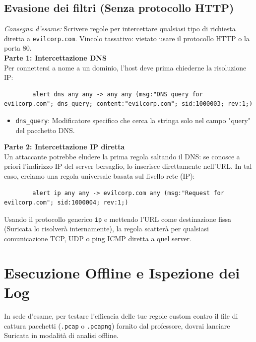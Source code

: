 \documentclass[12pt,a4paper]{report}
\begin{document}
	\subsection{Evasione dei filtri (Senza protocollo HTTP)}
	\textit{Consegna d'esame:} Scrivere regole per intercettare qualsiasi tipo di richiesta diretta a \texttt{evilcorp.com}. Vincolo tassativo: vietato usare il protocollo HTTP o la porta 80.\\
	\textbf{Parte 1: Intercettazione DNS}\\
	Per connettersi a nome a un dominio, l'host deve prima chiederne la risoluzione IP:
	\begin{lstlisting}
		alert dns any any -> any any (msg:"DNS query for evilcorp.com"; dns_query; content:"evilcorp.com"; sid:1000003; rev:1;)
	\end{lstlisting}
	\begin{itemize}
		\item \texttt{dns\_query}: Modificatore specifico che cerca la stringa solo nel campo "query" del pacchetto DNS.
	\end{itemize}
	\textbf{Parte 2: Intercettazione IP diretta}\\
	Un attaccante potrebbe eludere la prima regola saltando il DNS: se conosce a priori l'indirizzo IP del server bersaglio, lo inserisce direttamente nell'URL. In tal caso, creiamo una regola universale basata sul livello rete (IP):
	\begin{lstlisting}
		alert ip any any -> evilcorp.com any (msg:"Request for evilcorp.com"; sid:1000004; rev:1;)
	\end{lstlisting}
	Usando il protocollo generico \texttt{ip} e mettendo l'URL come destinazione fissa (Suricata lo risolverà internamente), la regola scatterà per qualsiasi comunicazione TCP, UDP o ping ICMP diretta a quel server.
	
	\section{Esecuzione Offline e Ispezione dei Log}
	In sede d'esame, per testare l'efficacia delle tue regole custom contro il file di cattura pacchetti (\texttt{.pcap} o \texttt{.pcapng}) fornito dal professore, dovrai lanciare Suricata in modalità di analisi offline.
	
\end{document}
